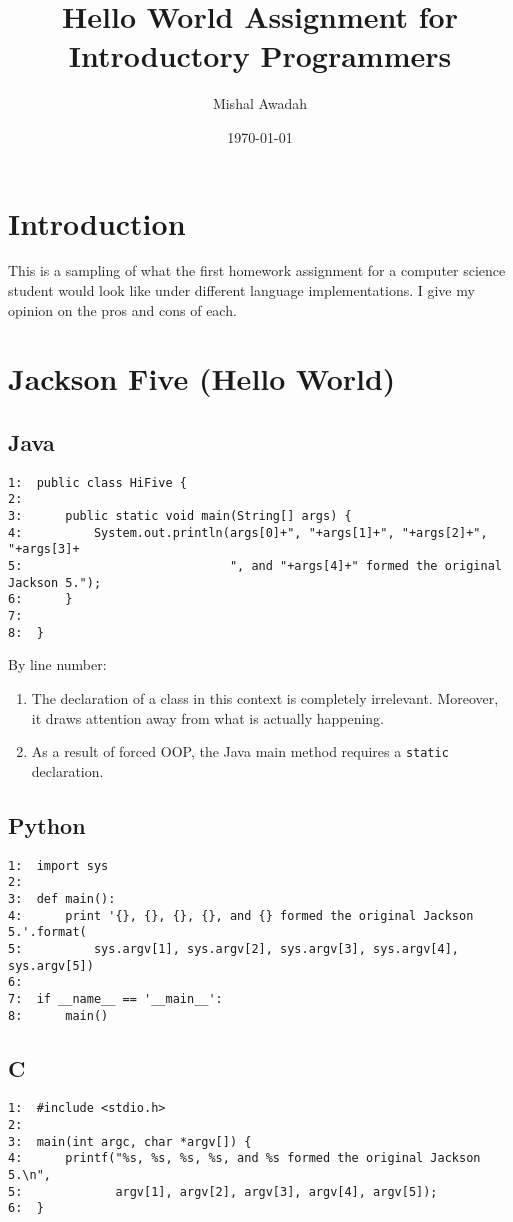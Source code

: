 \documentclass[11pt]{article}
\title{Hello World Assignment for Introductory Programmers}
\author{Mishal Awadah}
\date{\today}
\begin{document}
\maketitle



\section*{Introduction}
\label{sec-1}

  This is a sampling of what the first homework assignment for a computer
  science student would look like under different language
  implementations. I give my opinion on the pros and cons of each. 
\section*{Jackson Five (Hello World)}
\label{sec-2}
\subsection*{Java}
\label{sec-2-1}


\begin{verbatim}
1:  public class HiFive {
2:  
3:      public static void main(String[] args) {
4:          System.out.println(args[0]+", "+args[1]+", "+args[2]+", "+args[3]+
5:                             ", and "+args[4]+" formed the original Jackson 5.");
6:      }
7:  
8:  }
\end{verbatim}

    By line number: 

\begin{enumerate}
\item The declaration of a class in this context is completely
       irrelevant. Moreover, it draws attention away from what is
       actually happening.
\item As a result of forced OOP, the Java main method requires
       a \verb~static~ declaration.
\end{enumerate}
\subsection*{Python}
\label{sec-2-2}



\begin{verbatim}
1:  import sys
2:  
3:  def main():
4:      print '{}, {}, {}, {}, and {} formed the original Jackson 5.'.format(
5:          sys.argv[1], sys.argv[2], sys.argv[3], sys.argv[4], sys.argv[5])
6:  
7:  if __name__ == '__main__':
8:      main()
\end{verbatim}
\subsection*{C}
\label{sec-2-3}



\begin{verbatim}
1:  #include <stdio.h>
2:  
3:  main(int argc, char *argv[]) {
4:      printf("%s, %s, %s, %s, and %s formed the original Jackson 5.\n",
5:             argv[1], argv[2], argv[3], argv[4], argv[5]);
6:  }
\end{verbatim}
\end{document}
